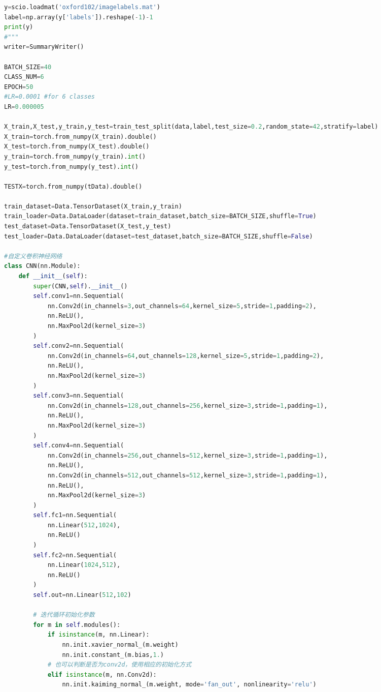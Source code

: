 \documentclass[supercite]{HustGraduPaper}
\begin{document}
\begin{sloppypar}
\begin{appendices}
\begin{spacing}{1.25}
\begin{lstlisting}[language=python]
y=scio.loadmat('oxford102/imagelabels.mat')
label=np.array(y['labels']).reshape(-1)-1
print(y)
#"""
writer=SummaryWriter()

BATCH_SIZE=40
CLASS_NUM=6
EPOCH=50
#LR=0.0001 #for 6 classes
LR=0.000005

X_train,X_test,y_train,y_test=train_test_split(data,label,test_size=0.2,random_state=42,stratify=label)
X_train=torch.from_numpy(X_train).double()
X_test=torch.from_numpy(X_test).double()
y_train=torch.from_numpy(y_train).int()
y_test=torch.from_numpy(y_test).int()

TESTX=torch.from_numpy(tData).double()

train_dataset=Data.TensorDataset(X_train,y_train)
train_loader=Data.DataLoader(dataset=train_dataset,batch_size=BATCH_SIZE,shuffle=True)
test_dataset=Data.TensorDataset(X_test,y_test)
test_loader=Data.DataLoader(dataset=test_dataset,batch_size=BATCH_SIZE,shuffle=False)

#自定义卷积神经网络
class CNN(nn.Module):
    def __init__(self):
        super(CNN,self).__init__()
        self.conv1=nn.Sequential(
            nn.Conv2d(in_channels=3,out_channels=64,kernel_size=5,stride=1,padding=2),
            nn.ReLU(),
            nn.MaxPool2d(kernel_size=3)
        )
        self.conv2=nn.Sequential(
            nn.Conv2d(in_channels=64,out_channels=128,kernel_size=5,stride=1,padding=2),
            nn.ReLU(),
            nn.MaxPool2d(kernel_size=3)
        )
        self.conv3=nn.Sequential(
            nn.Conv2d(in_channels=128,out_channels=256,kernel_size=3,stride=1,padding=1),
            nn.ReLU(),
            nn.MaxPool2d(kernel_size=3)
        )
        self.conv4=nn.Sequential(
            nn.Conv2d(in_channels=256,out_channels=512,kernel_size=3,stride=1,padding=1),
            nn.ReLU(),
            nn.Conv2d(in_channels=512,out_channels=512,kernel_size=3,stride=1,padding=1),
            nn.ReLU(),
            nn.MaxPool2d(kernel_size=3)
        )
        self.fc1=nn.Sequential(
            nn.Linear(512,1024),
            nn.ReLU()
        )
        self.fc2=nn.Sequential(
            nn.Linear(1024,512),
            nn.ReLU()
        )
        self.out=nn.Linear(512,102)

        # 迭代循环初始化参数
        for m in self.modules():
            if isinstance(m, nn.Linear):
                nn.init.xavier_normal_(m.weight)
                nn.init.constant_(m.bias,1.)
            # 也可以判断是否为conv2d，使用相应的初始化方式
            elif isinstance(m, nn.Conv2d):
                nn.init.kaiming_normal_(m.weight, mode='fan_out', nonlinearity='relu')


\end{lstlisting}
\end{spacing}
\end{appendices}
\end{sloppypar}
\end{document}
